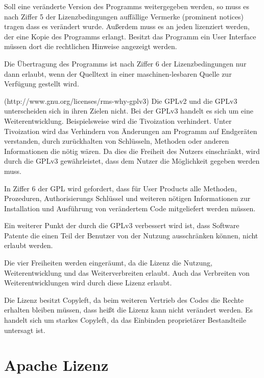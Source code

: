 Soll eine ver\"anderte Version des Programms weitergegeben werden, so muss es nach Ziffer 5 der Lizenzbedingungen auff\"allige Vermerke (\glqq{}prominent notices\grqq{}) tragen dass es ver\"andert wurde. Außerdem muss es an jeden lizenziert werden, der eine Kopie des Programms erlangt. Besitzt das Programm ein User Interface m\"ussen dort die rechtlichen Hinweise angezeigt werden. 

Die \"Ubertragung des Programms ist nach Ziffer 6 der Lizenzbedingungen nur dann erlaubt, wenn der Quelltext in einer maschinen-lesbaren Quelle zur Verf\"ugung gestellt wird. 

(http://www.gnu.org/licenses/rms-why-gplv3) Die GPLv2 und die GPLv3 unterscheiden sich in ihren Zielen nicht. Bei der GPLv3 handelt es sich um eine Weiterentwicklung. Beispielsweise wird die \glqq{}Tivoization\grqq{} verhindert. Unter \glqq{}Tivoization\grqq{} wird das Verhindern von \"Anderungen am Programm auf Endger\"aten verstanden, durch zur\"uckhalten von Schl\"usseln, Methoden oder anderen Informationen die n\"otig w\"aren. Da dies die Freiheit des Nutzers einschr\"ankt, wird durch die GPLv3 gew\"ahrleistet, dass dem Nutzer die M\"oglichkeit gegeben werden muss. 

In Ziffer 6 der GPL wird gefordert, dass f\"ur \glqq{}User Products\grqq{} alle Methoden, Prozeduren, Authorisierungs Schl\"ussel und weiteren n\"otigen Informationen zur Installation und Ausf\"uhrung von ver\"andertem Code mitgeliefert werden m\"ussen. 

Ein weiterer Punkt der durch die GPLv3 verbessert wird ist, dass Software Patente die einen Teil der Benutzer von der Nutzung ausschr\"anken k\"onnen, nicht erlaubt werden. 

Die vier Freiheiten werden einger\"aumt, da die Lizenz die Nutzung, Weiterentwicklung und das Weiterverbreiten erlaubt. Auch das Verbreiten von Weiterentwicklungen wird durch diese Lizenz erlaubt.

Die Lizenz besitzt Copyleft, da beim weiteren Vertrieb des Codes die Rechte erhalten bleiben m\"ussen, dass heißt die Lizenz kann nicht ver\"andert werden. Es handelt sich um starkes Copyleft, da das Einbinden propriet\"arer Bestandteile untersagt ist. 

\section{Apache Lizenz}

